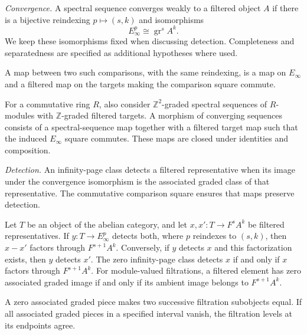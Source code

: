 \begin{definition}
\label{sem:SpectralSequence:convergence}
\label{sem:SpectralSequence:detection}
\textit{Convergence.} A spectral sequence converges weakly to a filtered
object $A$ if there is a bijective reindexing $p\mapsto(s,k)$ and
isomorphisms
\[
 E_\infty^p\cong\operatorname{gr}^{s}A^k.
\]
We keep these isomorphisms fixed when discussing detection.
Completeness and separatedness are specified as additional hypotheses where used.

A map between two such comparisons, with the same reindexing, is a map
on $E_\infty$ and a filtered map on the targets making the comparison
square commute.

For a commutative ring $R$, also consider $\mathbb Z^2$-graded spectral
sequences of $R$-modules with $\mathbb Z$-graded filtered targets. A
morphism of converging sequences consists of a spectral-sequence map
together with a filtered target map
such that the induced $E_\infty$ square commutes. These maps are closed
under identities and composition.

\textit{Detection.} An infinity-page class detects a filtered representative when its image under the convergence isomorphism is the associated graded class of that representative. The commutative comparison square ensures that maps preserve detection.

Let $T$ be an object of the abelian category, and let $x,x' : T\to F^sA^k$ be filtered representatives. If $y:T\to E_\infty^p$ detects both, where $p$ reindexes to $(s,k)$, then $x-x'$ factors through $F^{s+1}A^k$. Conversely, if $y$ detects $x$ and this factorization exists, then $y$ detects $x'$. The zero infinity-page class detects $x$ if and only if $x$ factors through $F^{s+1}A^k$. For module-valued filtrations, a filtered element has zero associated graded image if and only if its ambient image belongs to $F^{s+1}A^k$.

A zero associated graded piece makes two successive filtration subobjects equal. If all associated graded pieces in a specified interval vanish, the filtration levels at its endpoints agree.
\end{definition}


